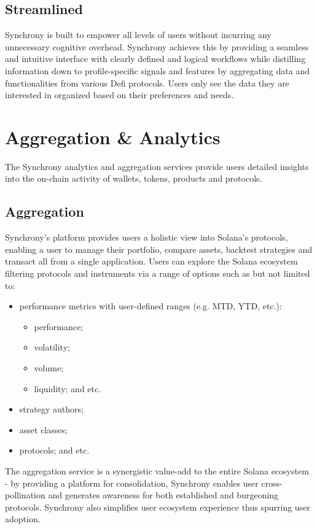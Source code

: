 \documentclass[10pt]{article}
\begin{document}
					\subsection{Streamlined}
					Synchrony is built to empower all levels of users without incurring any
					unnecessary cognitive overhead. Synchrony achieves this by providing a seamless
					and intuitive interface with clearly defined and logical workflows while
					distilling information down to profile-specific signals and features by
					aggregating data and functionalities from various Defi protocols. Users only see
					the data they are interested in organized based on their preferences and needs.
					\section{Aggregation \& Analytics}
					The Synchrony analytics and aggregation services provide users detailed insights
					into the on-chain activity of wallets, tokens, products and protocols.
					\subsection{Aggregation}
					Synchrony's platform provides users a holistic view into Solana's protocols,
					enabling a user to manage their portfolio, compare assets, backtest strategies
					and transact all from a single application. Users can explore the Solana
					ecosystem filtering protocols and instruments via a range of options such as but
					not limited to:
					\begin{itemize}
						\item performance metrics with user-defined ranges (e.g. MTD, YTD, etc.):
							\begin{itemize}
								\item performance;
								\item volatility;
								\item volume;
								\item liquidity; and etc.
							\end{itemize}
						\item strategy authors;
						\item asset classes;
						\item protocols; and etc.
					\end{itemize}
					The aggregation service is a synergistic value-add to the entire Solana
					ecosystem - by providing a platform for consolidation, Synchrony enables
					user cross-pollination and generates awareness for both established and
					burgeoning protocols. Synchrony also simplifies user ecosystem experience thus spurring
					user adoption.
\end{document}
